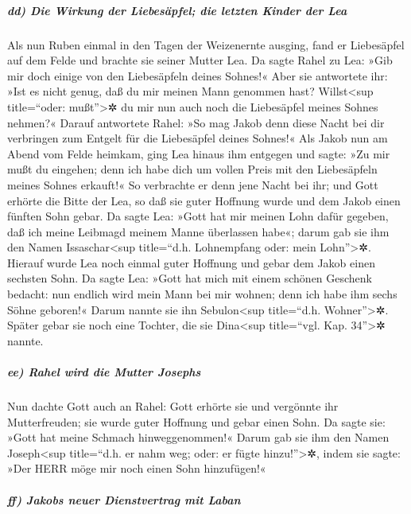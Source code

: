 \hypertarget{dd-die-wirkung-der-liebesuxe4pfel-die-letzten-kinder-der-lea}{%
\subparagraph{dd) Die Wirkung der Liebesäpfel; die letzten Kinder der
Lea}\label{dd-die-wirkung-der-liebesuxe4pfel-die-letzten-kinder-der-lea}}

 Als nun Ruben einmal in den Tagen der Weizenernte
ausging, fand er Liebesäpfel auf dem Felde und brachte sie seiner Mutter
Lea. Da sagte Rahel zu Lea: »Gib mir doch einige von den Liebesäpfeln
deines Sohnes!«  Aber sie antwortete ihr: »Ist es nicht
genug, daß du mir meinen Mann genommen hast? Willst\textless sup
title=``oder: mußt''\textgreater✲ du mir nun auch noch die Liebesäpfel
meines Sohnes nehmen?« Darauf antwortete Rahel: »So mag Jakob denn diese
Nacht bei dir verbringen zum Entgelt für die Liebesäpfel deines Sohnes!«
 Als Jakob nun am Abend vom Felde heimkam, ging Lea
hinaus ihm entgegen und sagte: »Zu mir mußt du eingehen; denn ich habe
dich um vollen Preis mit den Liebesäpfeln meines Sohnes erkauft!« So
verbrachte er denn jene Nacht bei ihr;  und Gott erhörte
die Bitte der Lea, so daß sie guter Hoffnung wurde und dem Jakob einen
fünften Sohn gebar.  Da sagte Lea: »Gott hat mir meinen
Lohn dafür gegeben, daß ich meine Leibmagd meinem Manne überlassen
habe«; darum gab sie ihm den Namen Issaschar\textless sup title=``d.h.
Lohnempfang oder: mein Lohn''\textgreater✲.  Hierauf
wurde Lea noch einmal guter Hoffnung und gebar dem Jakob einen sechsten
Sohn.  Da sagte Lea: »Gott hat mich mit einem schönen
Geschenk bedacht: nun endlich wird mein Mann bei mir wohnen; denn ich
habe ihm sechs Söhne geboren!« Darum nannte sie ihn Sebulon\textless sup
title=``d.h. Wohner''\textgreater✲.  Später gebar sie
noch eine Tochter, die sie Dina\textless sup title=``vgl. Kap.
34''\textgreater✲ nannte.

\hypertarget{ee-rahel-wird-die-mutter-josephs}{%
\subparagraph{ee) Rahel wird die Mutter
Josephs}\label{ee-rahel-wird-die-mutter-josephs}}

 Nun dachte Gott auch an Rahel: Gott erhörte sie und
vergönnte ihr Mutterfreuden;  sie wurde guter Hoffnung
und gebar einen Sohn. Da sagte sie: »Gott hat meine Schmach
hinweggenommen!«  Darum gab sie ihm den Namen
Joseph\textless sup title=``d.h. er nahm weg; oder: er fügte
hinzu!''\textgreater✲, indem sie sagte: »Der HERR möge mir noch einen
Sohn hinzufügen!«

\hypertarget{ff-jakobs-neuer-dienstvertrag-mit-laban}{%
\subparagraph{ff) Jakobs neuer Dienstvertrag mit
Laban}\label{ff-jakobs-neuer-dienstvertrag-mit-laban}}

